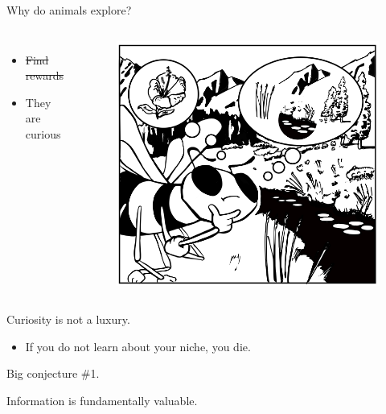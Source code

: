 \documentclass[10pt]{beamer}
\begin{document}
\begin{frame}[fragile]{Why do animals explore?}
\begin{columns}
\centering
\begin{itemize}
    \item \st{Find rewards}
    \item They are curious
\end{itemize}

\begin{figure}
    \centering
    \includegraphics[scale=0.8]{images/right_bee.png}
    \caption{}
\end{figure}
\end{columns}
\end{frame}

\begin{frame}[fragile]{Curiosity is not a luxury.}
\begin{itemize}
    \item If you do not learn about your niche, you die.
\end{itemize}
\end{frame}

\begin{frame}[fragile]{Big conjecture \#1.}
\begin{center}
    Information is fundamentally valuable.
\end{center}
\end{frame}
\end{document}
